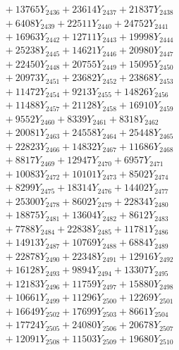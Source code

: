 \documentclass[a4paper,10pt]{article}
\begin{document}
{\begin{align}
&\;  + 13765 Y_{2436} + 23614 Y_{2437} + 21837 Y_{2438} \\[0.3ex]
&\;  + 6408 Y_{2439} + 22511 Y_{2440} + 24752 Y_{2441} \\[0.3ex]
&\;  + 16963 Y_{2442} + 12711 Y_{2443} + 19998 Y_{2444} \\[0.3ex]
&\;  + 25238 Y_{2445} + 14621 Y_{2446} + 20980 Y_{2447} \\[0.3ex]
&\;  + 22450 Y_{2448} + 20755 Y_{2449} + 15095 Y_{2450} \\[0.3ex]
&\;  + 20973 Y_{2451} + 23682 Y_{2452} + 23868 Y_{2453} \\[0.3ex]
&\;  + 11472 Y_{2454} + 9213 Y_{2455} + 14826 Y_{2456} \\[0.3ex]
&\;  + 11488 Y_{2457} + 21128 Y_{2458} + 16910 Y_{2459} \\[0.5ex]\allowbreak
&\;  + 9552 Y_{2460} + 8339 Y_{2461} + 8318 Y_{2462} \\[0.3ex]
&\;  + 20081 Y_{2463} + 24558 Y_{2464} + 25448 Y_{2465} \\[0.3ex]
&\;  + 22823 Y_{2466} + 14832 Y_{2467} + 11686 Y_{2468} \\[0.3ex]
&\;  + 8817 Y_{2469} + 12947 Y_{2470} + 6957 Y_{2471} \\[0.3ex]
&\;  + 10083 Y_{2472} + 10101 Y_{2473} + 8502 Y_{2474} \\[0.3ex]
&\;  + 8299 Y_{2475} + 18314 Y_{2476} + 14402 Y_{2477} \\[0.3ex]
&\;  + 25300 Y_{2478} + 8602 Y_{2479} + 22834 Y_{2480} \\[0.3ex]
&\;  + 18875 Y_{2481} + 13604 Y_{2482} + 8612 Y_{2483} \\[0.3ex]
&\;  + 7788 Y_{2484} + 22838 Y_{2485} + 11781 Y_{2486} \\[0.3ex]
&\;  + 14913 Y_{2487} + 10769 Y_{2488} + 6884 Y_{2489} \\[0.5ex]\allowbreak
&\;  + 22878 Y_{2490} + 22348 Y_{2491} + 12916 Y_{2492} \\[0.3ex]
&\;  + 16128 Y_{2493} + 9894 Y_{2494} + 13307 Y_{2495} \\[0.3ex]
&\;  + 12183 Y_{2496} + 11759 Y_{2497} + 15880 Y_{2498} \\[0.3ex]
&\;  + 10661 Y_{2499} + 11296 Y_{2500} + 12269 Y_{2501} \\[0.3ex]
&\;  + 16649 Y_{2502} + 17699 Y_{2503} + 8661 Y_{2504} \\[0.3ex]
&\;  + 17724 Y_{2505} + 24080 Y_{2506} + 20678 Y_{2507} \\[0.3ex]
&\;  + 12091 Y_{2508} + 11503 Y_{2509} + 19680 Y_{2510} \\[0.3ex]

\end{align}}
\end{document}
